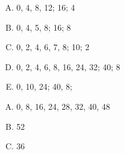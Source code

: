 {{        %
        \begin{practicec}
            \begin{enumerate}[A.]
                \item 0, 4, 8, 12; 16; 4
                \item 0, 4, 5, 8; 16; 8
                \item 0, 2, 4, 6, 7, 8; 10; 2
                \item 0, 2, 4, 6, 8, 16, 24, 32; 40; 8
                \item 0, 10, 24; 40, 8;
            \end{enumerate}
        \end{practicec}

        \begin{practicec}
            \begin{enumerate}[A.]
                \item 0, 8, 16, 24, 28, 32, 40, 48
                \item 52
                \item 36
            \end{enumerate}
        \end{practicec}
    }
}
